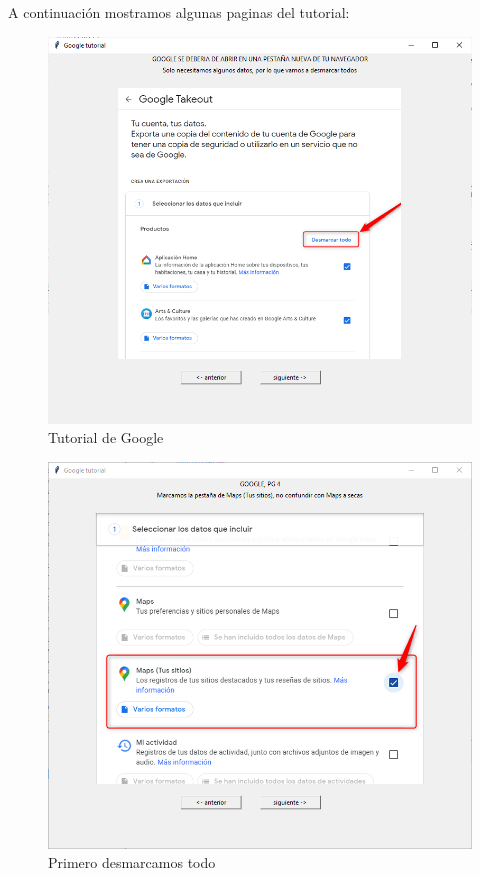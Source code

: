 A continuación mostramos algunas paginas del tutorial:
\begin{figure}
	\begin{center}
		\includegraphics[scale=0.5]{Imagenes/Fuentes/TutorialDescargaG2.png} \caption{Tutorial de Google}
		\label{TutorialDescargaG2}
	\end{center}
\end{figure}
\begin{figure}
\begin{center}
	\includegraphics[scale=0.5]{Imagenes/Fuentes/TutorialDescargaG3.png} \caption{Primero desmarcamos todo}
	\label{TutorialDescargaG3}
\end{center}
\end{figure}
